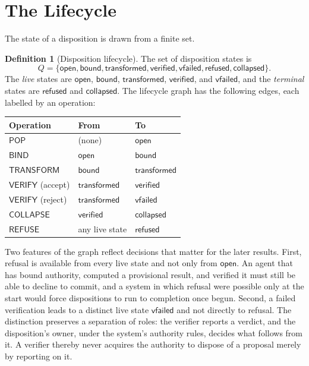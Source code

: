 \documentclass[11pt,twoside,openright]{book}
\theoremstyle{plain}
\theoremstyle{definition}
\newtheorem{definition}[theorem]{Definition}
\theoremstyle{remark}
\newcommand{\pop}{\mathsf{POP}}
\newcommand{\refuse}{\mathsf{REFUSE}}
\newcommand{\bind}{\mathsf{BIND}}
\newcommand{\transform}{\mathsf{TRANSFORM}}
\newcommand{\verify}{\mathsf{VERIFY}}
\newcommand{\collapse}{\mathsf{COLLAPSE}}
\begin{document}
\section{The Lifecycle}

The state of a disposition is drawn from a finite set.

\begin{definition}[Disposition lifecycle]\label{def:lifecycle}
The set of disposition states is
\[
Q=\{\mathsf{open},\mathsf{bound},\mathsf{transformed},\mathsf{verified},\mathsf{vfailed},\mathsf{refused},\mathsf{collapsed}\}.
\]
 The \emph{live} states are $\mathsf{open}$, $\mathsf{bound}$, $\mathsf{transformed}$, $\mathsf{verified}$, and $\mathsf{vfailed}$, and the \emph{terminal} states are $\mathsf{refused}$ and $\mathsf{collapsed}$. The lifecycle graph has the following edges, each labelled by an operation:
\begin{center}
\begin{tabular}{@{}lll@{}}
\toprule
Operation & From & To\\
\midrule
$\pop$ & (none) & $\mathsf{open}$\\
$\bind$ & $\mathsf{open}$ & $\mathsf{bound}$\\
$\transform$ & $\mathsf{bound}$ & $\mathsf{transformed}$\\
$\verify$ (accept) & $\mathsf{transformed}$ & $\mathsf{verified}$\\
$\verify$ (reject) & $\mathsf{transformed}$ & $\mathsf{vfailed}$\\
$\collapse$ & $\mathsf{verified}$ & $\mathsf{collapsed}$\\
$\refuse$ & any live state & $\mathsf{refused}$\\
\bottomrule
\end{tabular}
\end{center}
\end{definition}

Two features of the graph reflect decisions that matter for the later results. First, refusal is available from every live state and not only from $\mathsf{open}$. An agent that has bound authority, computed a provisional result, and verified it must still be able to decline to commit, and a system in which refusal were possible only at the start would force dispositions to run to completion once begun. Second, a failed verification leads to a distinct live state $\mathsf{vfailed}$ and not directly to refusal. The distinction preserves a separation of roles: the verifier reports a verdict, and the disposition's owner, under the system's authority rules, decides what follows from it. A verifier thereby never acquires the authority to dispose of a proposal merely by reporting on it.
\end{document}
